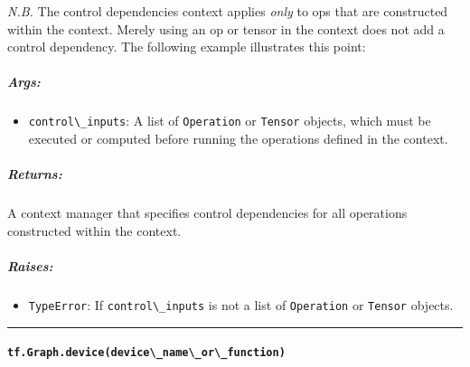 \emph{N.B.} The control dependencies context applies \emph{only} to ops
that are constructed within the context. Merely using an op or tensor in
the context does not add a control dependency. The following example
illustrates this point:

\begin{Shaded}
\begin{Highlighting}[]
 
  \OperatorTok{=} 
   
     

 
   
     
\end{Highlighting}
\end{Shaded}

\subparagraph{Args: }\label{args-1}

\begin{itemize}
\tightlist
\item
  \lstinline{control\_inputs}: A list of \lstinline{Operation} or
  \lstinline{Tensor} objects, which must be executed or computed before
  running the operations defined in the context.
\end{itemize}

\subparagraph{Returns: }\label{returns-2}

A context manager that specifies control dependencies for all operations
constructed within the context.

\subparagraph{Raises: }\label{raises}

\begin{itemize}
\tightlist
\item
  \lstinline{TypeError}: If \lstinline{control\_inputs} is not a list of
  \lstinline{Operation} or \lstinline{Tensor} objects.
\end{itemize}

\begin{center}\rule{0.5\linewidth}{\linethickness}\end{center}

\paragraph{\texorpdfstring{\lstinline{tf.Graph.device(device\_name\_or\_function)}
}{tf.Graph.device(device\_name\_or\_function) }}\label{tf.graph.devicedeviceux5fnameux5forux5ffunction}

